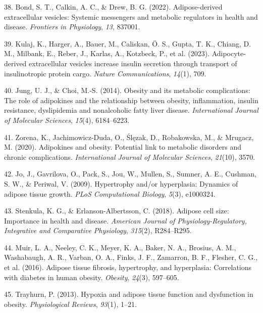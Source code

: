 \documentclass[
  11pt,
  letterpaper,
]{book}
\newlength{\cslhangindent}
\newenvironment{CSLReferences}[2] %
 {\begin{list}{}{%
  \setlength{\itemindent}{0pt}
  \setlength{\leftmargin}{0pt}
  \setlength{\parsep}{0pt}
  \ifodd #1
   \setlength{\leftmargin}{\cslhangindent}
   \setlength{\itemindent}{-1\cslhangindent}
  \fi
  \setlength{\itemsep}{#2\baselineskip}}}
 {\end{list}}
\begin{document}
\begin{CSLReferences}{1}{0}
38. Bond, S. T., Calkin, A. C., \& Drew, B. G. (2022). Adipose-derived
extracellular vesicles: Systemic messengers and metabolic regulators in
health and disease. \emph{Frontiers in Physiology}, \emph{13}, 837001.

39. Kulaj, K., Harger, A., Bauer, M., Caliskan, Ö. S., Gupta, T. K.,
Chiang, D. M., Milbank, E., Reber, J., Karlas, A., Kotzbeck, P., et al.
(2023). Adipocyte-derived extracellular vesicles increase insulin
secretion through transport of insulinotropic protein cargo.
\emph{Nature Communications}, \emph{14}(1), 709.

40. Jung, U. J., \& Choi, M.-S. (2014). Obesity and its metabolic
complications: The role of adipokines and the relationship between
obesity, inflammation, insulin resistance, dyslipidemia and nonalcoholic
fatty liver disease. \emph{International Journal of Molecular Sciences},
\emph{15}(4), 6184--6223.

41. Zorena, K., Jachimowicz-Duda, O., Ślęzak, D., Robakowska, M., \&
Mrugacz, M. (2020). Adipokines and obesity. Potential link to metabolic
disorders and chronic complications. \emph{International Journal of
Molecular Sciences}, \emph{21}(10), 3570.

42. Jo, J., Gavrilova, O., Pack, S., Jou, W., Mullen, S., Sumner, A. E.,
Cushman, S. W., \& Periwal, V. (2009). Hypertrophy and/or hyperplasia:
Dynamics of adipose tissue growth. \emph{PLoS Computational Biology},
\emph{5}(3), e1000324.

43. Stenkula, K. G., \& Erlanson-Albertsson, C. (2018). Adipose cell
size: Importance in health and disease. \emph{American Journal of
Physiology-Regulatory, Integrative and Comparative Physiology},
\emph{315}(2), R284--R295.

44. Muir, L. A., Neeley, C. K., Meyer, K. A., Baker, N. A., Brosius, A.
M., Washabaugh, A. R., Varban, O. A., Finks, J. F., Zamarron, B. F.,
Flesher, C. G., et al. (2016). Adipose tissue fibrosis, hypertrophy, and
hyperplasia: Correlations with diabetes in human obesity.
\emph{Obesity}, \emph{24}(3), 597--605.

45. Trayhurn, P. (2013). Hypoxia and adipose tissue function and
dysfunction in obesity. \emph{Physiological Reviews}, \emph{93}(1),
1--21.


\end{CSLReferences}
\end{document}
